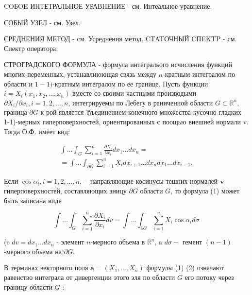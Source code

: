 \documentclass[10pt]{article}
\begin{document}
COБOE ИНТЕТРАЛЬНОЕ УРАВНЕНИЕ - см. Интеальное уравнение.



СОБЫЙ УЗЕЛ - см. Узел.



СРЕДНЕНИЯ МЕТОД - см. Усреднения метод. CTATОЧНЫЙ CПEKTP - см. Спектр оператора.



СТРОГРАДСКОГО ФОРМУЛА - формула интегралього исчисления функций многих переменных, устанавлиюющая связь между $n$-кратным интегралом по области и $1-1)$-кратным интегралом по ее границе. Пусть функции $i=X_{i}\left(x_{1}, x_{2}, \ldots, x_{n}\right)$ вместе со своими частными производыми $\partial X_{i} / \partial x_{i}, i=1,2, \ldots, n$, интегрируемы по Лебегу в раниченной области $G \subset \mathbb{R}^{n}$, граница $\partial G$ к-рой является Ђъединением конечного множества кусочно гладких 1-1)-мерных гиперповерхностей, ориентированных с поощью внешней нормали v. Тогда О.Ф. имеет вид:



\[

\begin{gathered}

\int \ldots \int_{G} \sum_{i=1}^{n} \frac{\partial X_{i}}{\partial x_{i}} d x_{1} \ldots d x_{n}= \\

=\int \ldots \int_{\partial G} \sum_{i=1}^{n} X_{i} d x_{i+1} \ldots d x_{n} d x_{1} \ldots d x_{i-1} .

\end{gathered}

\]



Если $\cos \alpha_{i}, i=1,2, \ldots, n,-$ направляющие косинусы тешних нормалей $\mathbf{v}$ гиперповерхностей, составляющих аницу $\partial G$ области $G$, то формула (1) может быть записана виде



\[

\int \ldots \int_{G} \sum_{i=1}^{n} \frac{\partial X_{i}}{\partial x_{i}} d v=\int \ldots \int_{\partial G} \sum_{i=1}^{n} X_{i} \cos \alpha_{i} d \sigma

\]



(e $d v=d x_{1} \ldots d x_{n}$ - элемент $n$-мерного объема в $\mathbb{R}^{n}$, a $d \sigma-$ гемент $(n-1)$-мерного объема на $\partial G$.



В терминах векторного поля $\boldsymbol{a}=\left(X_{1}, \ldots, X_{n}\right)$ формулы (1) (2) означают равенство интеграла от дивергенции этого эля по области $G$ его потоку через границу области $G$ :
\end{document}
